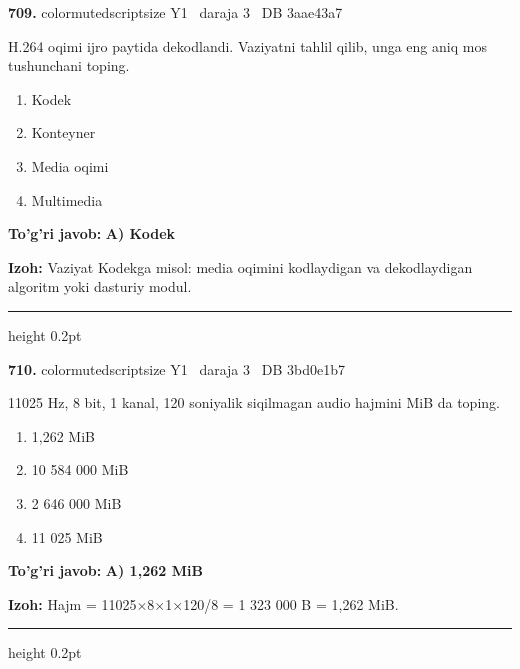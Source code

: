 \documentclass[10pt,a4paper,oneside]{article}
\begin{document}
\noindent\textbf{\color{ink}709.}  {color{muted}scriptsize Y1 \textbullet\ daraja 3 \textbullet\ DB 3aae43a7}
\par
H.264 oqimi ijro paytida dekodlandi. Vaziyatni tahlil qilib, unga eng aniq mos tushunchani toping.
\begin{enumerate}[label=\Alph*),leftmargin=9mm]
\item Kodek
\item Konteyner
\item Media oqimi
\item Multimedia
\end{enumerate}
\begin{tcolorbox}[enhanced,breakable,colback=teal!4,colframe=teal!50!black,boxrule=0.5pt,arc=1.1mm,left=3mm,right=3mm,top=1.7mm,bottom=1.7mm,before skip=2mm,after skip=2mm]
\textbf{\color{teal}To'g'ri javob:} \textbf{A) Kodek}
\par\smallskip
\textbf{Izoh:} Vaziyat Kodekga misol: media oqimini kodlaydigan va dekodlaydigan algoritm yoki dasturiy modul.
\end{tcolorbox}
\vspace{2mm}\hrule height 0.2pt \vspace{3mm}

\noindent\textbf{\color{ink}710.}  {color{muted}scriptsize Y1 \textbullet\ daraja 3 \textbullet\ DB 3bd0e1b7}
\par
11025 Hz, 8 bit, 1 kanal, 120 soniyalik siqilmagan audio hajmini MiB da toping.
\begin{enumerate}[label=\Alph*),leftmargin=9mm]
\item 1,262 MiB
\item 10 584 000 MiB
\item 2 646 000 MiB
\item 11 025 MiB
\end{enumerate}
\begin{tcolorbox}[enhanced,breakable,colback=teal!4,colframe=teal!50!black,boxrule=0.5pt,arc=1.1mm,left=3mm,right=3mm,top=1.7mm,bottom=1.7mm,before skip=2mm,after skip=2mm]
\textbf{\color{teal}To'g'ri javob:} \textbf{A) 1,262 MiB}
\par\smallskip
\textbf{Izoh:} Hajm = 11025\ensuremath{\times}8\ensuremath{\times}1\ensuremath{\times}120/8 = 1 323 000 B = 1,262 MiB.
\end{tcolorbox}
\vspace{2mm}\hrule height 0.2pt \vspace{3mm}
\end{document}
